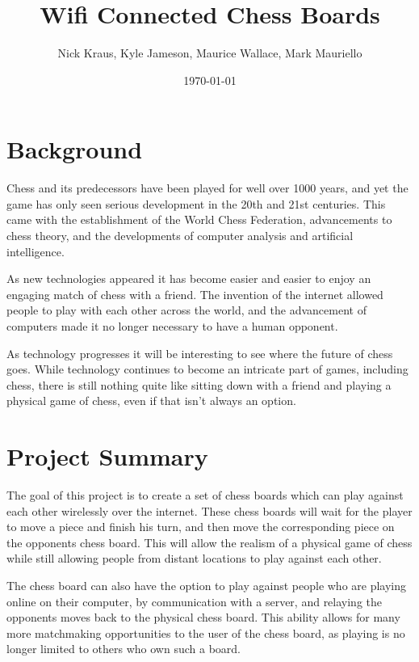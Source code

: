 \documentclass{article}
\title{Wifi Connected Chess Boards}
\author{Nick Kraus, Kyle Jameson, Maurice Wallace, Mark Mauriello}
\date{\today}
\begin{document}
\maketitle


\section*{Background}
\indent

Chess and its predecessors have been played for well over 1000 years, and yet the game has only seen serious development in the 20th and 21st centuries. This came with the establishment of the World Chess Federation, advancements to chess theory, and the developments of computer analysis and artificial intelligence.\\
\indent

As new technologies appeared it has become easier and easier to enjoy an engaging match of chess with a friend. The invention of the internet allowed people to play with each other across the world, and the advancement of computers made it no longer necessary to have a human opponent.\\
\indent

As technology progresses it will be interesting to see where the future of chess goes. While technology continues to become an intricate part of games, including chess, there is still nothing quite like sitting down with a friend and playing a physical game of chess, even if that isn't always an option.


\section*{Project Summary}
\indent

The goal of this project is to create a set of chess boards which can play against each other wirelessly over the internet. These chess boards will wait for the player to move a piece and finish his turn, and then move the corresponding piece on the opponents chess board. This will allow the realism of a physical game of chess while still allowing people from distant locations to play against each other.\\
\indent

The chess board can also have the option to play against people who are playing online on their computer, by communication with a server, and relaying the opponents moves back to the physical chess board. This ability allows for many more matchmaking opportunities to the user of the chess board, as playing is no longer limited to others who own such a board.
\end{document}
